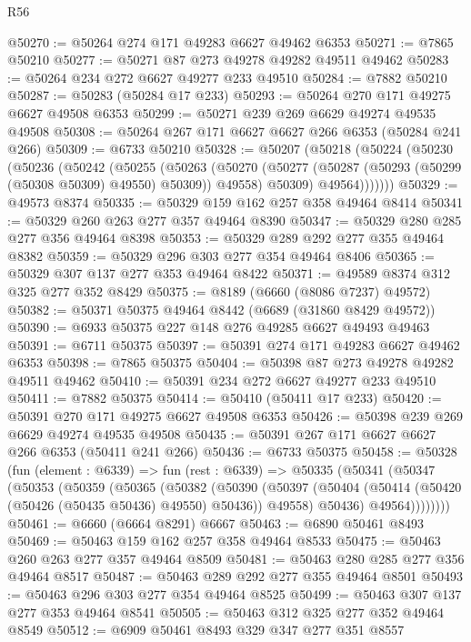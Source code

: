 \begin{lexlean}{R56}
\begin{coremodule}
@50270 := @50264 @274 @171 @49283 @6627 @49462 @6353
@50271 := @7865 @50210
@50277 := @50271 @87 @273 @49278 @49282 @49511 @49462
@50283 := @50264 @234 @272 @6627 @49277 @233 @49510
@50284 := @7882 @50210
@50287 := @50283 (@50284 @17 @233)
@50293 := @50264 @270 @171 @49275 @6627 @49508 @6353
@50299 := @50271 @239 @269 @6629 @49274 @49535 @49508
@50308 := @50264 @267 @171 @6627 @6627 @266 @6353 (@50284 @241 @266)
@50309 := @6733 @50210
@50328 := @50207
    (@50218
      (@50224
        (@50230
          (@50236
            (@50242
              (@50255
                (@50263
                  (@50270
                    (@50277 (@50287 (@50293 (@50299 (@50308 @50309) @49550) @50309)) @49558)
                    @50309)
                  @49564)))))))
@50329 := @49573 @8374
@50335 := @50329 @159 @162 @257 @358 @49464 @8414
@50341 := @50329 @260 @263 @277 @357 @49464 @8390
@50347 := @50329 @280 @285 @277 @356 @49464 @8398
@50353 := @50329 @289 @292 @277 @355 @49464 @8382
@50359 := @50329 @296 @303 @277 @354 @49464 @8406
@50365 := @50329 @307 @137 @277 @353 @49464 @8422
@50371 := @49589 @8374 @312 @325 @277 @352 @8429
@50375 := @8189 (@6660 (@8086 @7237) @49572)
@50382 := @50371 @50375 @49464 @8442 (@6689 (@31860 @8429 @49572))
@50390 := @6933 @50375 @227 @148 @276 @49285 @6627 @49493 @49463
@50391 := @6711 @50375
@50397 := @50391 @274 @171 @49283 @6627 @49462 @6353
@50398 := @7865 @50375
@50404 := @50398 @87 @273 @49278 @49282 @49511 @49462
@50410 := @50391 @234 @272 @6627 @49277 @233 @49510
@50411 := @7882 @50375
@50414 := @50410 (@50411 @17 @233)
@50420 := @50391 @270 @171 @49275 @6627 @49508 @6353
@50426 := @50398 @239 @269 @6629 @49274 @49535 @49508
@50435 := @50391 @267 @171 @6627 @6627 @266 @6353 (@50411 @241 @266)
@50436 := @6733 @50375
@50458 := @50328
    (fun (element : @6339) =>
    fun (rest : @6339) =>
    @50335
      (@50341
        (@50347
          (@50353
            (@50359
              (@50365
                (@50382
                  (@50390
                    (@50397
                      (@50404 (@50414 (@50420 (@50426 (@50435 @50436) @49550) @50436)) @49558)
                      @50436)
                    @49564))))))))
@50461 := @6660 (@6664 @8291) @6667
@50463 := @6890 @50461 @8493
@50469 := @50463 @159 @162 @257 @358 @49464 @8533
@50475 := @50463 @260 @263 @277 @357 @49464 @8509
@50481 := @50463 @280 @285 @277 @356 @49464 @8517
@50487 := @50463 @289 @292 @277 @355 @49464 @8501
@50493 := @50463 @296 @303 @277 @354 @49464 @8525
@50499 := @50463 @307 @137 @277 @353 @49464 @8541
@50505 := @50463 @312 @325 @277 @352 @49464 @8549
@50512 := @6909 @50461 @8493 @329 @347 @277 @351 @8557

\end{coremodule}
\end{lexlean}
